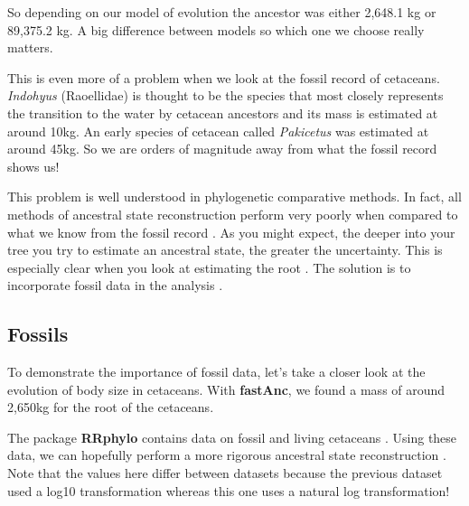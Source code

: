 \documentclass[
]{book}
\newenvironment{Shaded}{\begin{snugshade}}{\end{snugshade}}
\newcommand{\KeywordTok}[1]{\textcolor[rgb]{0.13,0.29,0.53}{\textbf{#1}}}
\newcommand{\NormalTok}[1]{#1}
\newcommand{\OperatorTok}[1]{\textcolor[rgb]{0.81,0.36,0.00}{\textbf{#1}}}
\newcommand{\StringTok}[1]{\textcolor[rgb]{0.31,0.60,0.02}{#1}}
\begin{document}
So depending on our model of evolution the ancestor was either 2,648.1 kg or 89,375.2 kg. A big difference between models so which one we choose really matters.

This is even more of a problem when we look at the fossil record of cetaceans. \emph{Indohyus} (Raoellidae) is thought to be the species that most closely represents the transition to the water by cetacean ancestors \citep{Thewissen09} and its mass is estimated at around 10kg. An early species of cetacean called \emph{Pakicetus} was estimated at around 45kg. So we are orders of magnitude away from what the fossil record shows us!

This problem is well understood in phylogenetic comparative methods. In fact, all methods of ancestral state reconstruction perform very poorly when compared to what we know from the fossil record \citep{Webster02}. As you might expect, the deeper into your tree you try to estimate an ancestral state, the greater the uncertainty. This is especially clear when you look at estimating the root \citep{Gascuel14}. The solution is to incorporate fossil data in the analysis \citep{Slater12}.

\hypertarget{fossils}{%
\subsection{Fossils}\label{fossils}}

To demonstrate the importance of fossil data, let's take a closer look at the evolution of body size in cetaceans. With \textbf{fastAnc}, we found a mass of around 2,650kg for the root of the cetaceans.

The package \textbf{RRphylo} \citep{rrphylo} contains data on fossil and living cetaceans \citep{Serio19}. Using these data, we can hopefully perform a more rigorous ancestral state reconstruction \citep{Castiglione20}. Note that the values here differ between datasets because the previous dataset used a log10 transformation whereas this one uses a natural log transformation!

\begin{Shaded}
\end{Shaded}
\end{document}
